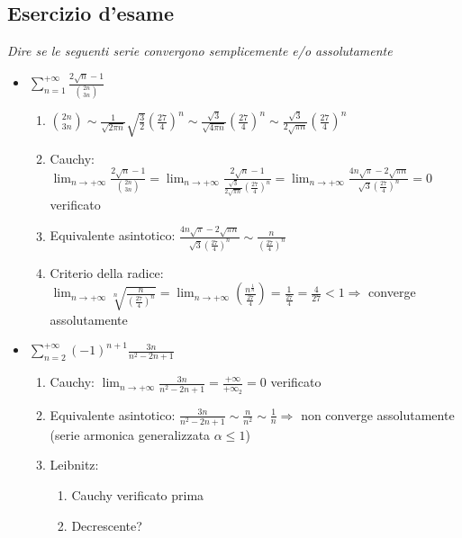 \documentclass[10pt, a4paper]{article}
\begin{document}
    \subsection{Esercizio d'esame}
        \textit{Dire se le seguenti serie convergono semplicemente e/o assolutamente}
        \begin{itemize}
            \item $\displaystyle \sum_{n=1}^{+\infty} \frac{2\sqrt{n}-1}{\binom{2n}{3n}}$ \begin{enumerate}
                \item $\displaystyle \binom{2n}{3n}\sim \frac{1}{\sqrt{2\pi n}}\sqrt{\frac{3}{2}}\left(\frac{27}{4}\right)^n\sim \frac{\sqrt{3}}{\sqrt{4\pi n}}\left(\frac{27}{4}\right)^n\sim\frac{\sqrt{3}}{2\sqrt{\pi n}}\left(\frac{27}{4}\right)^n$
                \item Cauchy: $\displaystyle \lim_{n\to +\infty}\frac{2\sqrt{n}-1}{\binom{2n}{3n}}=\lim_{n\to +\infty}\frac{2\sqrt{n}-1}{\frac{\sqrt{3}}{2\sqrt{\pi n}}\left(\frac{27}{4}\right)^n}=\lim_{n\to +\infty}\frac{4n\sqrt{\pi}-2\sqrt{\pi n}}{\sqrt{3}\left(\frac{27}{4}\right)^n}=0$ verificato
                \item Equivalente asintotico: $\displaystyle \frac{4n\sqrt{\pi}-2\sqrt{\pi n}}{\sqrt{3}\left(\frac{27}{4}\right)^n}\sim \frac{n}{\left(\frac{27}{4}\right)^n}$
                \item Criterio della radice: $\displaystyle \lim_{n\to +\infty}\sqrt[n]{\frac{n}{\left(\frac{27}{4}\right)^n}}=\lim_{n\to +\infty}\left(\frac{n^{\frac{1}{n}}}{\frac{27}{4}}\right)=\frac{1}{\frac{27}{4}}=\frac{4}{27}<1\Rightarrow$ converge assolutamente
            \end{enumerate}
            \item $\displaystyle \sum_{n=2}^{+\infty}(-1)^{n+1}\frac{3n}{n^2-2n+1}$ \begin{enumerate}
                \item Cauchy: $\displaystyle \lim_{n\to +\infty}\frac{3n}{n^2-2n+1}=\frac{+\infty}{+\infty_2}=0$ verificato
                \item Equivalente asintotico: $\displaystyle \frac{3n}{n^2-2n+1}\sim \frac{n}{n^2}\sim\frac{1}{n}\Rightarrow$ non converge assolutamente (serie armonica generalizzata $\alpha\leq 1$)
                \item Leibnitz: \begin{enumerate}
                    \item Cauchy verificato prima
                    \item Decrescente? \begin{equation*}

\end{equation*}
\end{enumerate}
\end{enumerate}
\end{itemize}
\end{document}
